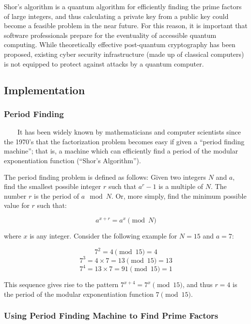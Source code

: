 \documentclass[11pt]{article}
\begin{document}
Shor's algorithm is a quantum algorithm for efficiently finding the
prime factors of large integers, and thus calculating a private key from
a public key could become a feasible problem in the near future. For
this reason, it is important that software professionals prepare for the
eventuality of accessible quantum computing. While theoretically
effective post-quantum cryptography has been proposed, existing cyber
security infrastructure (made up of classical computers) is not equipped
to protect against attacks by a quantum computer.

    \hypertarget{implementation}{%
\subsection{Implementation}\label{implementation}}

\hypertarget{period-finding}{%
\subsubsection{Period Finding}\label{period-finding}}

~~~~It has been widely known by mathematicians and computer scientists
since the 1970's that the factorization problem becomes easy if given a
``period finding machine''; that is, a machine which can efficiently
find a period of the modular exponentiation function (``Shor's
Algorithm'').

The period finding problem is defined as follows: Given two integers
\(N\) and \(a\), find the smallest possible integer \(r\) such that
\(a^r-1\) is a multiple of \(N\). The number \(r\) is the period of
\(a\mod N\). Or, more simply, find the minimum possible value for \(r\)
such that:

\[a^{x+r} = a^x\pmod N\]

where \(x\) is any integer. Consider the following example for \(N=15\)
and \(a=7\):

\[7^2=4\pmod{15}=4\] \[7^3=4\times 7=13\pmod{15}=13\]
\[7^4=13\times 7=91\pmod{15}=1\]

This sequence gives rise to the pattern \(7^{x+4}=7^x\pmod{15}\), and
thus \(r=4\) is the period of the modular exponentiation function
\(7\pmod{15}\).

    \hypertarget{using-period-finding-machine-to-find-prime-factors}{%
\subsubsection{Using Period Finding Machine to Find Prime
Factors}\label{using-period-finding-machine-to-find-prime-factors}}
\end{document}
